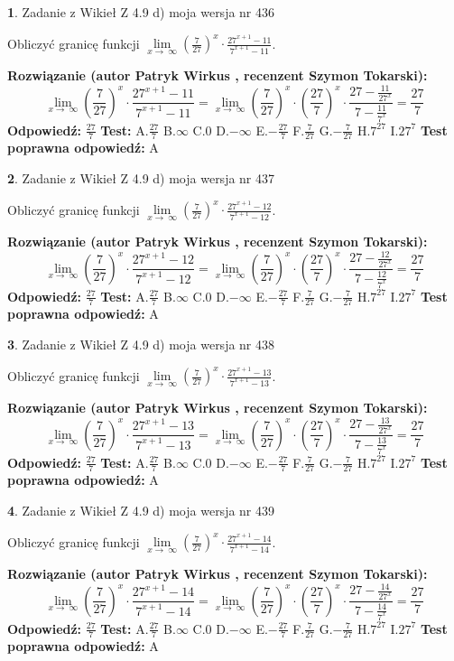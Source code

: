\documentclass[12pt, a4paper]{article}
\theoremstyle{definition} %
\newtheorem{zad}{}
\newcommand{\zadStart}[1]{\begin{zad}#1\newline}
\newcommand{\zadStop}{\end{zad}}
\newcommand{\rozwStart}[2]{\noindent \textbf{Rozwiązanie (autor #1 , recenzent #2): }\newline}
\newcommand{\rozwStop}{\newline}
\newcommand{\odpStart}{\noindent \textbf{Odpowiedź:}\newline}
\newcommand{\odpStop}{\newline}
\newcommand{\testStart}{\noindent \textbf{Test:}\newline}
\newcommand{\testStop}{\newline}
\newcommand{\kluczStart}{\noindent \textbf{Test poprawna odpowiedź:}\newline}
\newcommand{\kluczStop}{\newline}
\begin{document}
\zadStart{Zadanie z Wikieł Z 4.9 d) moja wersja nr 436}


Obliczyć granicę funkcji  $\lim\limits_{x\to\ \infty}(\frac{7}{27})^{x}\cdot\frac{27^{x+1}-11}{7^{x+1}-11}$.
\zadStop
\rozwStart{Patryk Wirkus}{Szymon Tokarski}
$$\lim\limits_{x\to\ \infty}(\frac{7}{27})^{x}\cdot\frac{27^{x+1}-11}{7^{x+1}-11}=\lim\limits_{x\to\ \infty}(\frac{7}{27})^{x}\cdot(\frac{27}{7})^{x} \cdot \frac{27-\frac{11}{27^{x}}}{7-\frac{11}{7^{x}}} = \frac{27}{7}$$
\rozwStop
\odpStart
$\frac{27}{7}$
\odpStop
\testStart
A.$\frac{27}{7}$ B.$\infty$ C.$0$ D.$-\infty$ E.$-\frac{27}{7}$
F.$\frac{7}{27}$ G.$-\frac{7}{27}$
H.$7^{27}$
I.$27^{7}$
\testStop
\kluczStart
A
\kluczStop



\zadStart{Zadanie z Wikieł Z 4.9 d) moja wersja nr 437}


Obliczyć granicę funkcji  $\lim\limits_{x\to\ \infty}(\frac{7}{27})^{x}\cdot\frac{27^{x+1}-12}{7^{x+1}-12}$.
\zadStop
\rozwStart{Patryk Wirkus}{Szymon Tokarski}
$$\lim\limits_{x\to\ \infty}(\frac{7}{27})^{x}\cdot\frac{27^{x+1}-12}{7^{x+1}-12}=\lim\limits_{x\to\ \infty}(\frac{7}{27})^{x}\cdot(\frac{27}{7})^{x} \cdot \frac{27-\frac{12}{27^{x}}}{7-\frac{12}{7^{x}}} = \frac{27}{7}$$
\rozwStop
\odpStart
$\frac{27}{7}$
\odpStop
\testStart
A.$\frac{27}{7}$ B.$\infty$ C.$0$ D.$-\infty$ E.$-\frac{27}{7}$
F.$\frac{7}{27}$ G.$-\frac{7}{27}$
H.$7^{27}$
I.$27^{7}$
\testStop
\kluczStart
A
\kluczStop



\zadStart{Zadanie z Wikieł Z 4.9 d) moja wersja nr 438}


Obliczyć granicę funkcji  $\lim\limits_{x\to\ \infty}(\frac{7}{27})^{x}\cdot\frac{27^{x+1}-13}{7^{x+1}-13}$.
\zadStop
\rozwStart{Patryk Wirkus}{Szymon Tokarski}
$$\lim\limits_{x\to\ \infty}(\frac{7}{27})^{x}\cdot\frac{27^{x+1}-13}{7^{x+1}-13}=\lim\limits_{x\to\ \infty}(\frac{7}{27})^{x}\cdot(\frac{27}{7})^{x} \cdot \frac{27-\frac{13}{27^{x}}}{7-\frac{13}{7^{x}}} = \frac{27}{7}$$
\rozwStop
\odpStart
$\frac{27}{7}$
\odpStop
\testStart
A.$\frac{27}{7}$ B.$\infty$ C.$0$ D.$-\infty$ E.$-\frac{27}{7}$
F.$\frac{7}{27}$ G.$-\frac{7}{27}$
H.$7^{27}$
I.$27^{7}$
\testStop
\kluczStart
A
\kluczStop



\zadStart{Zadanie z Wikieł Z 4.9 d) moja wersja nr 439}


Obliczyć granicę funkcji  $\lim\limits_{x\to\ \infty}(\frac{7}{27})^{x}\cdot\frac{27^{x+1}-14}{7^{x+1}-14}$.
\zadStop
\rozwStart{Patryk Wirkus}{Szymon Tokarski}
$$\lim\limits_{x\to\ \infty}(\frac{7}{27})^{x}\cdot\frac{27^{x+1}-14}{7^{x+1}-14}=\lim\limits_{x\to\ \infty}(\frac{7}{27})^{x}\cdot(\frac{27}{7})^{x} \cdot \frac{27-\frac{14}{27^{x}}}{7-\frac{14}{7^{x}}} = \frac{27}{7}$$
\rozwStop
\odpStart
$\frac{27}{7}$
\odpStop
\testStart
A.$\frac{27}{7}$ B.$\infty$ C.$0$ D.$-\infty$ E.$-\frac{27}{7}$
F.$\frac{7}{27}$ G.$-\frac{7}{27}$
H.$7^{27}$
I.$27^{7}$
\testStop
\kluczStart
A
\kluczStop
\end{document}
